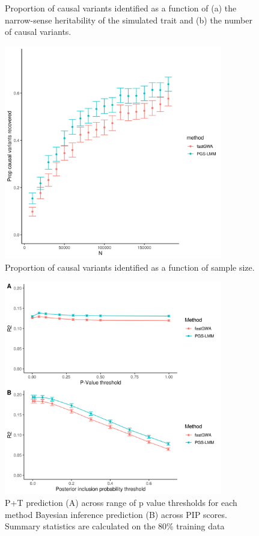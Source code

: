 \documentclass[doublespacing]{bmcart}
\begin{document}
\begin{backmatter}
\begin{figure}[h!]
  \caption{
      Proportion of causal variants identified as a function of (a) the narrow-sense heritability of the simulated trait and (b) the number of causal variants.}
      \end{figure}

\begin{figure}[h!]
  \includegraphics[width=0.85\textwidth]{images/Fig4.png}

  \caption{
      Proportion of causal variants identified as a function of sample size.}
      \end{figure}
      
\begin{figure}[h!]
  \includegraphics[width=0.85\textwidth]{images/Fig5.png}
  \caption{
      P+T prediction (A) across range of p value thresholds for each method Bayesian inference prediction (B) across PIP scores. Summary statistics are calculated on the 80\% training data}
      \end{figure}


\end{backmatter}
\end{document}
